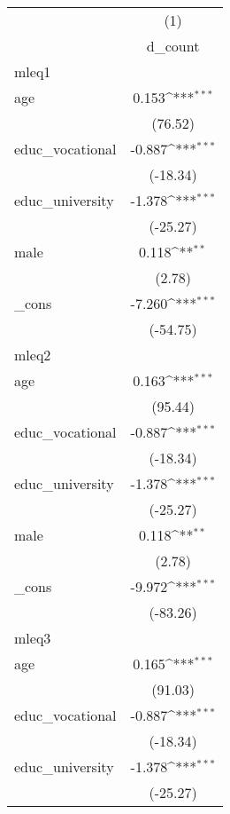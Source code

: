 {
\def\sym#1{\ifmmode^{#1}\else\(^{#1}\)\fi}
\begin{tabular}{l*{1}{c}}
\hline\hline
            &\multicolumn{1}{c}{(1)}\\
            &\multicolumn{1}{c}{d\_count}\\
\hline
mleq1       &                     \\
age         &       0.153\sym{***}\\
            &     (76.52)         \\
[1em]
educ\_vocational&      -0.887\sym{***}\\
            &    (-18.34)         \\
[1em]
educ\_university&      -1.378\sym{***}\\
            &    (-25.27)         \\
[1em]
male        &       0.118\sym{**} \\
            &      (2.78)         \\
[1em]
\_cons      &      -7.260\sym{***}\\
            &    (-54.75)         \\
\hline
mleq2       &                     \\
age         &       0.163\sym{***}\\
            &     (95.44)         \\
[1em]
educ\_vocational&      -0.887\sym{***}\\
            &    (-18.34)         \\
[1em]
educ\_university&      -1.378\sym{***}\\
            &    (-25.27)         \\
[1em]
male        &       0.118\sym{**} \\
            &      (2.78)         \\
[1em]
\_cons      &      -9.972\sym{***}\\
            &    (-83.26)         \\
\hline
mleq3       &                     \\
age         &       0.165\sym{***}\\
            &     (91.03)         \\
[1em]
educ\_vocational&      -0.887\sym{***}\\
            &    (-18.34)         \\
[1em]
educ\_university&      -1.378\sym{***}\\
            &    (-25.27)         \\

\end{tabular}}
